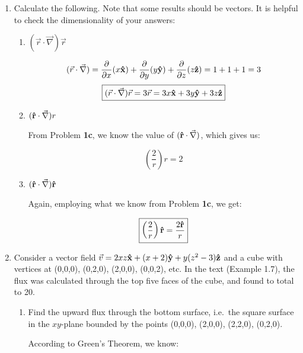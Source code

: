\begin{enumerate}
\begin{enumerate}
\begin{itemize}
        \end{itemize}

    \end{enumerate}

  \item Calculate the following. Note that some results should be vectors.  It is helpful to check the dimensionality of your answers:

    \begin{enumerate}

      \item $(\vec{r}\cdot\vec{\nabla})\vec{r}$

        $$(\vec{r}\cdot\vec{\nabla})=\frac{\partial}{\partial x}(x\bold{\hat{x}})+\frac{\partial}{\partial y} (y\bold{\hat{y}})+\frac{\partial}{\partial z}(z\bold{\hat{z}})=1+1+1=3$$
        $$\boxed{(\vec{r}\cdot\vec{\nabla})\vec{r}=3\vec{r}=3x\bold{\hat{x}}+3y\bold{\hat{y}}+3z\bold{\hat{z}}}$$

      \item $(\bold{\hat{r}}\cdot\vec{\nabla})r$

        From Problem \textbf{1c}, we know the value of $(\bold{\hat{r}}\cdot\vec{\nabla})$, which gives us:

        $$\boxed{\left( \frac{2}{r} \right)r=2}$$

      \item $(\bold{\hat{r}}\cdot\vec{\nabla})\bold{\hat{r}}$

        Again, employing what we know from Problem \textbf{1c}, we get:

        $$\boxed{\left( \frac{2}{r} \right)\bold{\hat{r}}=\frac{2\bold{\hat{r}}}{r}}$$

    \end{enumerate}

  \item Consider a vector field $\vec{v}=2xz\bold{\hat{x}}+(x+2)\bold{\hat{y}}+y(z^2-3)\bold{\hat{z}}$ and a cube with vertices at (0,0,0), (0,2,0), (2,0,0), (0,0,2), etc. In the text (Example 1.7), the flux was calculated through the top five faces of the cube, and found to total to 20.

    \begin{enumerate}

      \item Find the upward flux through the bottom surface, i.e.\ the square surface in the $xy$-plane bounded by the points (0,0,0), (2,0,0), (2,2,0), (0,2,0).

        According to Green's Theorem, we know:


\end{enumerate}
\end{enumerate}
